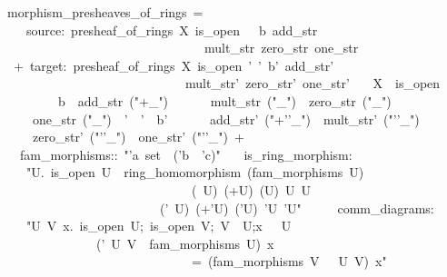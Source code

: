 \documentclass[12pt]{scrartcl}
\begin{document}
\begin{isabelle}
\ morphism\_presheaves\_of\_rings\ =\isanewline
\ \ \ \ source:\ presheaf\_of\_rings\ X\ is\_open\ \isasymFF \ \isasymrho \ b\ add\_str\isanewline
\ \ \ \ \ \ \ \ \ \ \ \ \ \ \ \ \ \ \ \ \ \ \ \ \ \ \ \ \ \ \ \ mult\_str\ zero\_str\ one\_str\isanewline
\ \ +\ target:\ presheaf\_of\_rings\ X\ is\_open\ \isasymFF '\ \isasymrho '\ b'\ add\_str'\ \isanewline
\ \ \ \ \ \ \ \ \ \ \ \ \ \ \ \ \ \ \ \ \ \ \ \ \ \ \ \ \ mult\_str'\ zero\_str'\ one\_str'\isanewline
\ \ \ X\ \ is\_open\isanewline
\ \ \ \ \ \isasymFF \ \ \isasymrho \ \ b\ \ add\_str\ ("+\isactrlbsub \_\isactrlesub ")\ \isanewline
\ \ \ \ \ mult\_str\ ("\isasymcdot \isactrlbsub \_\isactrlesub ")\ \ zero\_str\ ("\isasymzero \isactrlbsub \_\isactrlesub ")\ \isanewline
\ \ \ \ \ one\_str\ ("\isasymone \isactrlbsub \_\isactrlesub ")\ \ \isasymFF '\ \ \isasymrho '\ \ b'\ \isanewline
\ \ \ \ \ add\_str'\ ("+'{\kern0pt}'\isactrlbsub \_\isactrlesub ")\ \ mult\_str'\ ("\isasymcdot '{\kern0pt}'\isactrlbsub \_\isactrlesub ")\isanewline
\ \ \ \ \ zero\_str'\ ("\isasymzero '{\kern0pt}'\isactrlbsub \_\isactrlesub ")\ \ one\_str'\ ("\isasymone '{\kern0pt}'\isactrlbsub \_\isactrlesub ")\ +\isanewline
\ \ \ fam\_morphisms::\ "'a\ set\ \isasymRightarrow \ ('b\ \isasymRightarrow \ 'c)"\isanewline
\ \ \ is\_ring\_morphism:\ \isanewline
\ \ \ \ "\isasymAnd U.\ is\_open\ U\ \isasymLongrightarrow \ ring\_homomorphism\ (fam\_morphisms\ U)\isanewline
\ \ \ \ \ \ \ \ \ \ \ \ \ \ \ \ \ \ \ \ \ \ \ \ \ \ \ \ \ \ (\isasymFF \ U)\ (+\isactrlbsub U\isactrlesub )\ (\isasymcdot \isactrlbsub U\isactrlesub )\ \isasymzero \isactrlbsub U\isactrlesub \ \isasymone \isactrlbsub U\isactrlesub \isanewline
\ \ \ \ \ \ \ \ \ \ \ \ \ \ \ \ \ \ \ \ \ \ \ \ \ (\isasymFF '\ U)\ (+'\isactrlbsub U\isactrlesub )\ (\isasymcdot '\isactrlbsub U\isactrlesub )\ \isasymzero '\isactrlbsub U\isactrlesub \ \isasymone '\isactrlbsub U\isactrlesub "\isanewline
\ \ \ \ \ comm\_diagrams:\ \isanewline
\ \ \ \ "\isasymAnd U\ V\ x.\ \isasymlbrakk is\_open\ U;\ is\_open\ V;\ V\ \isasymsubseteq \ U;x\ \isasymin \ \isasymFF \ U\ \isasymrbrakk \isanewline
\ \ \ \ \ \ \ \ \ \ \ \ \ \ \isasymLongrightarrow \ (\isasymrho '\ U\ V\ \isasymcirc \ fam\_morphisms\ U)\ x\ \isanewline
\ \ \ \ \ \ \ \ \ \ \ \ \ \ \ \ \ \ \ \ \ \ \ \ \ \ \ \ \ \ =\ (fam\_morphisms\ V\ \isasymcirc \ \isasymrho \ U\ V)\ x"
\end{isabelle}
\end{document}
